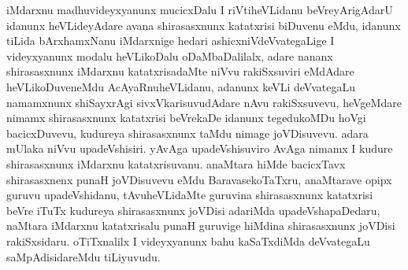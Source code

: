 \centerline{}

\begin{artha}
iMdarxnu madhuvideyxyanunx mucicxDalu I riVtiheVLidanu beVreyArigAdarU idanunx heVLideyAdare avana shirasasxnunx katatxrisi biDuvenu eMdu, idanunx tiLida bArxhamxNanu iMdarxnige hedari ashicxniVdeVvategaLige I videyxyanunx modalu heVLikoDalu oDaMbaDalilalx, adare nananx shirasasxnunx iMdarxnu katatxrisadaMte niVvu rakiSxsuviri eMdAdare heVLikoDuveneMdu AcAyaRnuheVLidanu, adanunx keVLi deVvategaLu namamxnunx shiSayxrAgi sivxVkarisuvudAdare nAvu rakiSxsuvevu, heVgeMdare nimamx shirasasxnunx katatxrisi beVrekaDe idanunx tegedukoMDu hoVgi bacicxDuvevu, kudureya shirasasxnunx taMdu nimage joVDisuvevu. adara mUlaka niVvu upadeVshisiri. yAvAga upadeVshisuviro AvAga nimamx I kudure shirasasxnunx iMdarxnu katatxrisuvanu. anaMtara hiMde bacicxTavx shirasasxnenx punaH joVDisuvevu eMdu BaravasekoTaTxru, anaMtarave opipx guruvu upadeVshidanu, tAvuheVLidaMte guruvina shirasasxnunx katatxrisi beVre iTuTx kudureya shirasasxnunx joVDisi adariMda upadeVshapaDedaru, naMtara iMdarxnu katatxrisalu punaH guruvige  hiMdina shirasasxnunx joVDisi rakiSxsidaru. oTiTxnalilx I videyxyanunx bahu kaSaTxdiMda deVvategaLu saMpAdisidareMdu tiLiyuvudu.
\end{artha}

